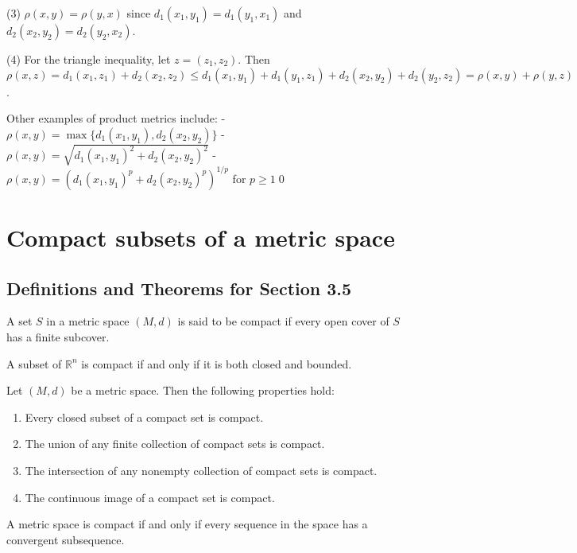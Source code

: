 (3) $\rho(x,y) = \rho(y,x)$ since $d_1(x_1,y_1) = d_1(y_1,x_1)$ and $d_2(x_2,y_2) = d_2(y_2,x_2)$.

(4) For the triangle inequality, let $z = (z_1,z_2)$. Then $\rho(x,z) = d_1(x_1,z_1) + d_2(x_2,z_2) \leq d_1(x_1,y_1) + d_1(y_1,z_1) + d_2(x_2,y_2) + d_2(y_2,z_2) = \rho(x,y) + \rho(y,z)$.

Other examples of product metrics include:
- $\rho(x,y) = \max\{d_1(x_1,y_1), d_2(x_2,y_2)\}$
- $\rho(x,y) = \sqrt{d_1(x_1,y_1)^2 + d_2(x_2,y_2)^2}$
- $\rho(x,y) = (d_1(x_1,y_1)^p + d_2(x_2,y_2)^p)^{1/p}$ for $p \geq 1$\qed
\section{Compact subsets of a metric space}

\subsection*{Definitions and Theorems for Section 3.5}

\begin{definition}
A set $S$ in a metric space $(M,d)$ is said to be compact if every open cover of $S$ has a finite subcover.
\end{definition}

\begin{theorem}
A subset of $\mathbb{R}^n$ is compact if and only if it is both closed and bounded.
\end{theorem}

\begin{theorem}
Let $(M,d)$ be a metric space. Then the following properties hold:
\begin{enumerate}
\item Every closed subset of a compact set is compact.
\item The union of any finite collection of compact sets is compact.
\item The intersection of any nonempty collection of compact sets is compact.
\item The continuous image of a compact set is compact.
\end{enumerate}
\end{theorem}

\begin{theorem}
A metric space is compact if and only if every sequence in the space has a convergent subsequence.
\end{theorem}


